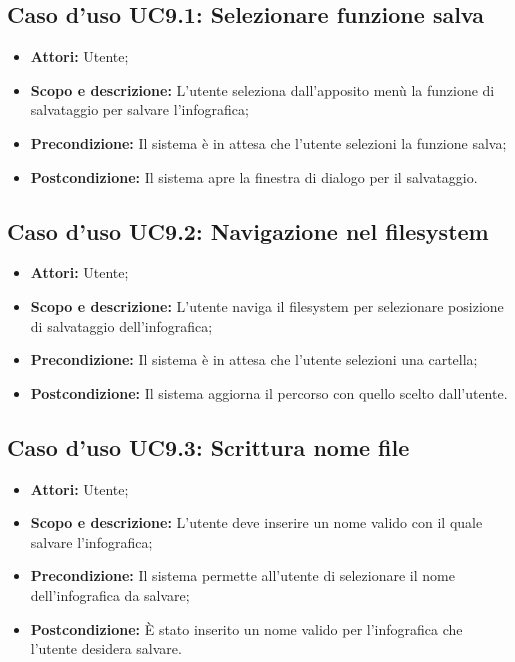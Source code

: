 \subsection{Caso d'uso UC9.1: Selezionare funzione salva}
\begin{itemize}
	\item \textbf{Attori:} Utente;
	\item \textbf{Scopo e descrizione:} L'utente seleziona dall'apposito menù la funzione di salvataggio per salvare l'\gls{infografica};
	\item \textbf{Precondizione:} Il sistema è in attesa che l'utente selezioni la funzione salva;
	\item \textbf{Postcondizione:} Il sistema apre la finestra di dialogo per il salvataggio.
\end{itemize}

\subsection{Caso d'uso UC9.2: Navigazione nel filesystem}
\begin{itemize}
	\item \textbf{Attori:} Utente;
	\item \textbf{Scopo e descrizione:} L'utente naviga il \gls{filesystem} per selezionare posizione di salvataggio dell'\gls{infografica};
	\item \textbf{Precondizione:} Il sistema è in attesa che l'utente selezioni una cartella;
	\item \textbf{Postcondizione:} Il sistema aggiorna il percorso con quello scelto dall'utente.
\end{itemize}

\subsection{Caso d'uso UC9.3: Scrittura nome file}
\begin{itemize}
	\item \textbf{Attori:} Utente;
	\item \textbf{Scopo e descrizione:} L'utente deve inserire un nome valido con il quale salvare l'\gls{infografica};
	\item \textbf{Precondizione:} Il sistema permette all'utente di selezionare il nome dell'\gls{infografica} da salvare;
	\item \textbf{Postcondizione:} È stato inserito un nome valido per l'\gls{infografica} che l'utente desidera salvare.
\end{itemize}

